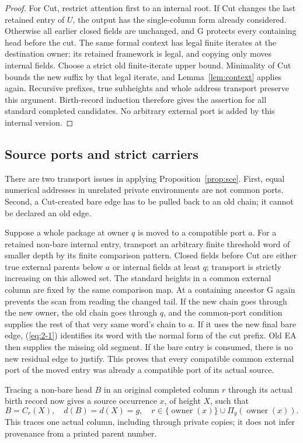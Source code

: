 \begin{proof}
For Cut, restrict attention first to an internal root. If Cut changes
the last retained entry of $U$, the output has the single-column form
already considered. Otherwise all earlier closed fields are unchanged,
and G protects every containing head before the cut. The same formal
context has legal finite iterates at the destination owner: its retained
framework is legal, and copying only moves internal fields. Choose a
strict old finite-iterate upper bound. Minimality of Cut bounds the new
suffix by that legal iterate, and Lemma~\ref{lem:context} applies again.
Recursive prefixes, true subheights and whole address transport preserve
this argument. Birth-record induction therefore gives the assertion for
all standard completed candidates. No arbitrary external port is added
by this internal version.
\end{proof}

\subsection{Source ports and strict carriers}\label{sec:strict-proof}
There are two transport issues in applying Proposition~\ref{prop:sce}.
First, equal numerical addresses in unrelated private environments are
not common ports. Second, a Cut-created bare edge has to be pulled back
to an old chain; it cannot be declared an old edge.

Suppose a whole package at owner $q$ is moved to a compatible port $a$.
For a retained non-bare internal entry, transport an arbitrary finite
threshold word of smaller depth by its finite comparison pattern.
Closed fields before Cut are either true external parents below $a$ or
internal fields at least $q$; transport is strictly increasing on this
allowed set. The standard heights in a common external column are
fixed by the same comparison map. At a containing ancestor G again
prevents the scan from reading the changed tail. If the new chain goes
through the new owner, the old chain goes through $q$, and the common-port
condition supplies the rest of that very same word's chain to $a$.
If it uses the new final bare edge, (\ref{eq:2-1}) identifies its word with the
normal form of the cut prefix. Old EA then supplies the missing old
segment. If the bare entry is consumed, there is no new residual edge
to justify. This proves that every compatible common external port of
the moved entry was already a compatible port of its actual source.

Tracing a non-bare head $B$ in an original completed column $r$ through
its actual birth record now gives a source occurrence $x$, of height
$X$, such that
\begin{equation}\label{eq:3-5}
 B=C_r(X),\quad d(B)=d(X)=g,\quad
 r\in\{\operatorname{owner}(x)\}\cup
       \Pi_g(\operatorname{owner}(x)).                 
\end{equation}
This traces one actual column, including through private copies; it
does not infer provenance from a printed parent number.

